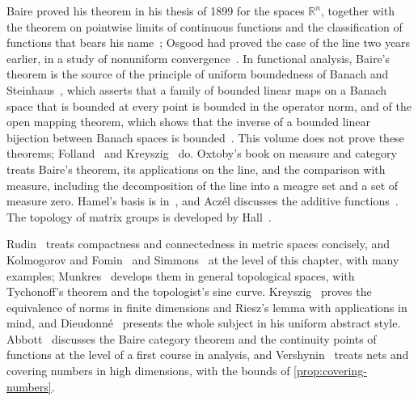 Baire proved his theorem in his thesis of 1899 for the spaces $\mathbb R^n$, together with the theorem on pointwise limits of continuous functions and the classification of functions that bears his name~\cite{baire1899}; Osgood had proved the case of the line two years earlier, in a study of nonuniform convergence~\cite{osgood1897}. In functional analysis, Baire's theorem is the source of the principle of uniform boundedness of Banach and Steinhaus~\cite{banach1927}, which asserts that a family of bounded linear maps on a Banach space that is bounded at every point is bounded in the operator norm, and of the open mapping theorem, which shows that the inverse of a bounded linear bijection between Banach spaces is bounded~\cite{banach1932}. This volume does not prove these theorems; Folland~\cite[Sect.~5.3]{folland1999} and Kreyszig~\cite{kreyszig1978} do. Oxtoby's book on measure and category~\cite{oxtoby1980} treats Baire's theorem, its applications on the line, and the comparison with measure, including the decomposition of the line into a meagre set and a set of measure zero. Hamel's basis is in~\cite{hamel1905}, and Acz\'el discusses the additive functions~\cite{aczel1966}. The topology of matrix groups is developed by Hall~\cite{hall2015}.

Rudin~\cite[Chaps.~2 and~4]{rudin1976} treats compactness and connectedness in metric spaces concisely, and Kolmogorov and Fomin~\cite{kolmogorov1975} and Simmons~\cite{simmons1963} at the level of this chapter, with many examples; Munkres~\cite{munkres2000} develops them in general topological spaces, with Tychonoff's theorem and the topologist's sine curve. Kreyszig~\cite[Sect.~2.4--2.5]{kreyszig1978} proves the equivalence of norms in finite dimensions and Riesz's lemma with applications in mind, and Dieudonn\'e~\cite{dieudonne1960} presents the whole subject in his uniform abstract style. Abbott~\cite{abbott2015} discusses the Baire category theorem and the continuity points of functions at the level of a first course in analysis, and Vershynin~\cite[Sect.~4.2]{vershynin2018} treats nets and covering numbers in high dimensions, with the bounds of \cref{prop:covering-numbers}.

\chapterreferences
